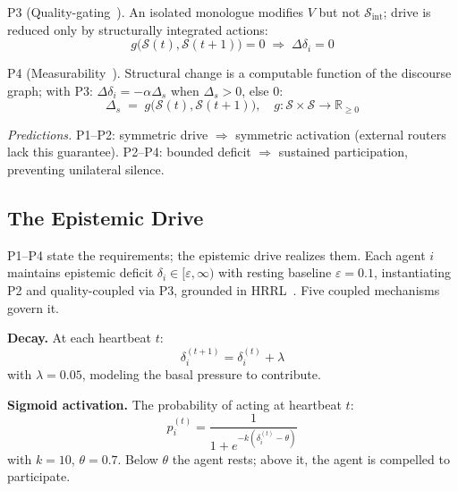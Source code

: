 \documentclass{llncs}
\begin{document}
\noindent\textsc{P3} (Quality-gating~\parencite{ryan2001happiness,huta2014eudaimonia}).
An isolated monologue modifies $V$ but not $\mathcal{S}_{\text{int}}$;
drive is reduced only by structurally integrated actions:
\begin{equation}
    g\!\bigl(\mathcal{S}(t),\mathcal{S}(t{+}1)\bigr)=0
    \;\Rightarrow\; \Delta\delta_i=0
    \label{eq:a3}
\end{equation}

\noindent\textsc{P4} (Measurability~\parencite{tononi2016integrated}).
Structural change is a computable function of the discourse graph;
with P3: $\Delta\delta_i = -\alpha\Delta_s$ when $\Delta_s>0$, else $0$:
\begin{equation}
    \Delta_s \;=\; g\!\bigl(\mathcal{S}(t),\mathcal{S}(t{+}1)\bigr),
    \quad g:\mathcal{S}\times\mathcal{S}\to\mathbb{R}_{\geq 0}
    \label{eq:a4}
\end{equation}

\noindent\textit{Predictions.} P1--P2: symmetric drive $\Rightarrow$ symmetric
activation (external routers lack this guarantee). P2--P4: bounded deficit
$\Rightarrow$ sustained participation, preventing unilateral silence.

\subsection{The Epistemic Drive}

P1--P4 state the requirements; the epistemic drive realizes them.
Each agent $i$ maintains epistemic deficit
$\delta_i \in [\varepsilon, \infty)$ with resting baseline
$\varepsilon = 0.1$, instantiating P2 and quality-coupled via P3,
grounded in HRRL~\parencite{keramati2014homeostatic}.
Five coupled mechanisms govern it.

\textbf{Decay.} At each heartbeat $t$:
\begin{equation}
    \delta_i^{(t+1)} = \delta_i^{(t)} + \lambda
    \label{eq:decay}
\end{equation}
with $\lambda = 0.05$, modeling the basal pressure to contribute.

\textbf{Sigmoid activation.} The probability of acting at heartbeat $t$:
\begin{equation}
    p_i^{(t)} = \frac{1}{1 + e^{-k(\delta_i^{(t)} - \theta)}}
    \label{eq:sigmoid}
\end{equation}
with $k = 10$, $\theta = 0.7$. Below $\theta$ the agent rests; above it,
the agent is compelled to participate.
\end{document}
